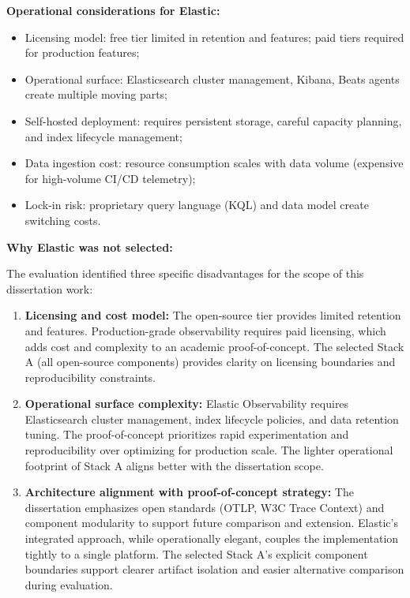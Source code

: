 \textbf{Operational considerations for Elastic:}
\begin{itemize}
    \item Licensing model: free tier limited in retention and features; paid tiers required for production features;
    \item Operational surface: Elasticsearch cluster management, Kibana, Beats agents create multiple moving parts;
    \item Self-hosted deployment: requires persistent storage, careful capacity planning, and index lifecycle management;
    \item Data ingestion cost: resource consumption scales with data volume (expensive for high-volume CI/CD telemetry);
    \item Lock-in risk: proprietary query language (KQL) and data model create switching costs.
\end{itemize}

\textbf{Why Elastic was not selected:}

The evaluation identified three specific disadvantages for the scope of this dissertation work:

\begin{enumerate}
    \item \textbf{Licensing and cost model:} The open-source tier provides limited retention and features. Production-grade observability requires paid licensing, which adds cost and complexity to an academic proof-of-concept. The selected Stack A (all open-source components) provides clarity on licensing boundaries and reproducibility constraints.

    \item \textbf{Operational surface complexity:} Elastic Observability requires Elasticsearch cluster management, index lifecycle policies, and data retention tuning. The proof-of-concept prioritizes rapid experimentation and reproducibility over optimizing for production scale. The lighter operational footprint of Stack A aligns better with the dissertation scope.

    \item \textbf{Architecture alignment with proof-of-concept strategy:} The dissertation emphasizes open standards (OTLP, W3C Trace Context) and component modularity to support future comparison and extension. Elastic's integrated approach, while operationally elegant, couples the implementation tightly to a single platform. The selected Stack A's explicit component boundaries support clearer artifact isolation and easier alternative comparison during evaluation.
\end{enumerate}

